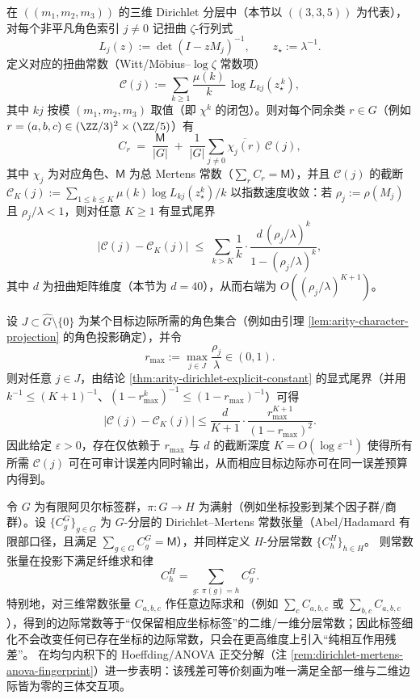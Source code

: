 \begin{remark}\label{thm:arity-dirichlet-explicit-constant}
在 \(((m_1,m_2,m_3))\) 的三维 Dirichlet 分层中（本节以 \(((3,3,5))\) 为代表），对每个非平凡角色索引 \(j\neq 0\) 记扭曲 \(\zeta\)-行列式
\[
L_j(z):=\det(I-zM_j)^{-1},
\qquad
z_\star:=\lambda^{-1}.
\]
定义对应的扭曲常数（Witt/Möbius--\(\log\zeta\) 常数项）
\[
\mathcal{C}(j):=\sum_{k\ge 1}\frac{\mu(k)}{k}\,\log L_{kj}\!\left(z_\star^{\,k}\right),
\]
其中 \(kj\) 按模 \((m_1,m_2,m_3)\) 取值（即 \(\chi^{k}\) 的闭包）。则对每个同余类 \(r\in G\)（例如 \(r=(a,b,c)\in(\ZZ/3)^2\times(\ZZ/5)\)）有
\[
C_r
\;=\;
\frac{\mathsf{M}}{|G|}
\;+\;
\frac{1}{|G|}\sum_{j\neq 0}\overline{\chi_j(r)}\,\mathcal{C}(j),
\]
其中 \(\chi_j\) 为对应角色、\(\mathsf{M}\) 为总 Mertens 常数（\(\sum_r C_r=\mathsf{M}\)），并且 \(\mathcal{C}(j)\) 的截断
\(
\mathcal{C}_K(j):=\sum_{1\le k\le K}\mu(k)\log L_{kj}(z_\star^k)/k
\)
以指数速度收敛：若 \(\rho_j:=\rho(M_j)\) 且 \(\rho_j/\lambda<1\)，则对任意 \(K\ge 1\) 有显式尾界
\[
\left|\mathcal{C}(j)-\mathcal{C}_K(j)\right|
\;\le\;
\sum_{k>K}\frac{1}{k}\cdot
\frac{d\,(\rho_j/\lambda)^k}{1-(\rho_j/\lambda)^k},
\]
其中 \(d\) 为扭曲矩阵维度（本节为 \(d=40\)），从而右端为 \(O((\rho_j/\lambda)^{K+1})\)。
\end{remark}

\begin{remark}[误差预算下的对数截断深度]\label{rem:arity-dirichlet-explicit-constant-truncation-depth}
设 \(J\subset \widehat G\setminus\{0\}\) 为某个目标边际所需的角色集合（例如由引理 \ref{lem:arity-character-projection} 的角色投影确定），并令
\[
r_{\max}:=\max_{j\in J}\frac{\rho_j}{\lambda}\in(0,1).
\]
则对任意 \(j\in J\)，由结论 \ref{thm:arity-dirichlet-explicit-constant} 的显式尾界（并用 \(k^{-1}\le (K+1)^{-1}\)、\((1-r_{\max}^k)^{-1}\le (1-r_{\max})^{-1}\)）可得
\[
\bigl|\mathcal{C}(j)-\mathcal{C}_K(j)\bigr|
\le
\frac{d}{K+1}\cdot\frac{r_{\max}^{K+1}}{(1-r_{\max})^2}.
\]
因此给定 \(\varepsilon>0\)，存在仅依赖于 \(r_{\max}\) 与 \(d\) 的截断深度 \(K=O(\log\varepsilon^{-1})\) 使得所有所需 \(\mathcal{C}(j)\) 可在可审计误差内同时输出，从而相应目标边际亦可在同一误差预算内得到。
\end{remark}

\begin{remark}\label{thm:dirichlet-mertens-functoriality}
令 \(G\) 为有限阿贝尔标签群，\(\pi:G\to H\) 为满射（例如坐标投影到某个因子群/商群）。设
\(\{C^G_g\}_{g\in G}\) 为 \(G\)-分层的 Dirichlet--Mertens 常数张量（Abel/Hadamard 有限部口径，且满足 \(\sum_{g\in G}C^G_g=\mathsf{M}\)），并同样定义 \(H\)-分层常数 \(\{C^H_h\}_{h\in H}\)。
则常数张量在投影下满足纤维求和律
\[
C^H_h=\sum_{g:\ \pi(g)=h}C^G_g.
\]
特别地，对三维常数张量 \(C_{a,b,c}\) 作任意边际求和（例如 \(\sum_c C_{a,b,c}\) 或 \(\sum_{b,c}C_{a,b,c}\)），得到的边际常数等于“仅保留相应坐标标签”的二维/一维分层常数；因此标签细化不会改变任何已存在坐标的边际常数，只会在更高维度上引入“纯相互作用残差”。
在均匀内积下的 Hoeffding/ANOVA 正交分解（注 \ref{rem:dirichlet-mertens-anova-fingerprint}）进一步表明：该残差可等价刻画为唯一满足全部一维与二维边际皆为零的三体交互项。
\end{remark}

